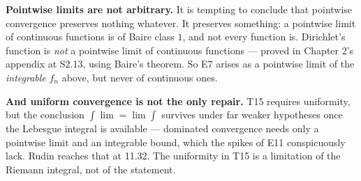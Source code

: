 \begin{deeper}
\textbf{Pointwise limits are not arbitrary.} It is tempting to conclude that
pointwise convergence preserves nothing whatever. It preserves something:
a pointwise limit of continuous functions is of Baire class $1$, and not
every function is. Dirichlet's function is \emph{not} a pointwise limit of
continuous functions --- proved in Chapter 2's appendix at S2.13, using
Baire's theorem. So E7 arises as a pointwise limit of the \emph{integrable}
$f_n$ above, but never of continuous ones.

\smallskip
\textbf{And uniform convergence is not the only repair.} T15 requires
uniformity, but the conclusion $\int \lim = \lim \int$ survives under far
weaker hypotheses once the Lebesgue integral is available --- dominated
convergence needs only a pointwise limit and an integrable bound, which the
spikes of E11 conspicuously lack. Rudin reaches that at 11.32. The
uniformity in T15 is a limitation of the Riemann integral, not of the
statement.
\end{deeper}
